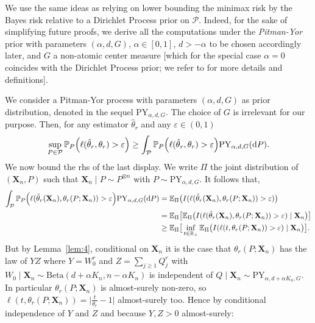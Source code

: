 \documentclass{article}
\newcommand{\1}{\boldsymbol{1}}
\newcommand{\EE}{\mathbb{E}}
\newcommand{\PP}{\mathbb{P}}
\theoremstyle{plain}
\begin{document}
We use the same ideas as \cite{Fad(18)} relying on lower bounding the minimax risk by the Bayes risk relative to a Dirichlet Process prior on $\mathcal{P}$. Indeed, for the sake of simplifying future proofs, we derive all the computations under the \textit{Pitman-Yor} prior with parameters $(\alpha,d,G)$, $\alpha \in [0,1]$, $d > -\alpha$ to be chosen accordingly later, and $G$ a non-atomic center measure [which for the special case $\alpha=0$ coincides with the Dirichlet Process prior; we refer to \cite[Section~14.4]{Gho(17)} for more details and definitions].

We consider a Pitman-Yor process with parameters $(\alpha,d,G)$ as prior distribution, denoted in the sequel $\mathrm{PY}_{\alpha,d,G}$. The choice of $G$ is irrelevant for our purpose. Then, for any estimator $\hat{\theta}_r$ and any $\varepsilon \in (0,1)$
\begin{align}
  \label{eq:5bis}
  \sup_{P\in \mathcal{P}}\PP_P\Big( \ell(\hat{\theta}_r,\theta_r) > \varepsilon \Big)%
    \geq \int_{\mathcal{P}}\PP_P\Big( \ell(\hat{\theta}_r,\theta_r) > \varepsilon \Big) \mathrm{PY}_{\alpha,d,G}(\intd P).%
\end{align}
We now bound the rhs of the last display. We write $\Pi$ the joint distribution of $(\mathbf{X}_n,P)$ such that $\mathbf{X}_n\mid P \sim P^{\otimes n}$ with $P \sim \mathrm{PY}_{\alpha,d,G}$. It follows that,
\begin{align}
  \notag \int_{\mathcal{P}}\PP_P\Big(\ell(\hat{\theta}_r(\mathbf{X}_n),\theta_r(P;\mathbf{X}_n)) > \varepsilon \Big) \mathrm{PY}_{\alpha,d,G}(\intd P)%
  \notag
  &= \EE_{\Pi}\big(I( \ell(\hat{\theta}_r(\mathbf{X}_n),\theta_r(P;\mathbf{X}_n)) > \varepsilon )\big)\\
  \notag
  &= \EE_{\Pi}\big[ \EE_{\Pi}\big(I(  \ell(\hat{\theta}_r(\mathbf{X}_n),\theta_r(P;\mathbf{X}_n)) > \varepsilon ) \mid \mathbf{X}_n\big) \big]\\
  \label{eq:11}
  &\geq \EE_{\Pi}\big[ \inf_{t \in \NNReals} \EE_{\Pi}\big(I(  \ell(t,\theta_r(P;\mathbf{X}_n)) > \varepsilon ) \mid \mathbf{X}_n\big) \big].
\end{align}
But by Lemma~\ref{lem:4}, conditional on $\mathbf{X}_n$ it is the case that
$\theta_r(P;\mathbf{X}_n)$ has the law of $YZ$ where $Y = W_0^{r}$ and
$Z = \sum_{j\geq 1}Q_j^r$ with $W_0 \mid \mathbf{X}_n \sim\mathrm{Beta}(d + \alpha K_n,  n - \alpha K_n)$
is independent of
$Q \mid \mathbf{X}_n \sim \mathrm{PY}_{\alpha,d+\alpha K_n,G}$. In particular $\theta_r(P;\mathbf{X}_n)$ is almost-surely non-zero, so $\ell(t,\theta_r(P;\mathbf{X}_n)) = \big|\frac{t}{\theta_r} -1 \big|$ almost-surely too. Hence by conditional independence of $Y$ and $Z$ and because $Y,Z > 0$ almost-surely:
\end{document}
